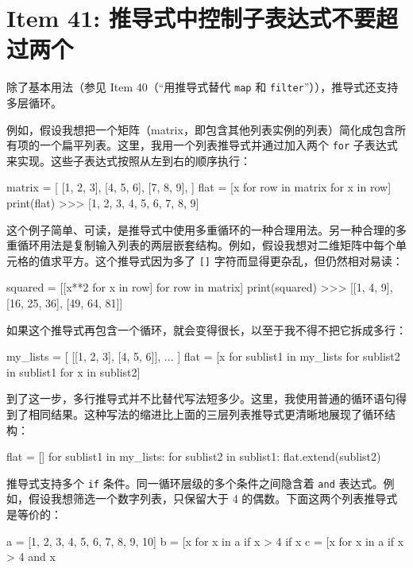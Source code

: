 \section{Item 41: 推导式中控制子表达式不要超过两个}

除了基本用法（参见 Item 40（``用推导式替代 \texttt{map} 和 \texttt{filter}''）），推导式还支持多层循环。

例如，假设我想把一个矩阵（matrix，即包含其他列表实例的列表）简化成包含所有项的一个扁平列表。这里，我用一个列表推导式并通过加入两个 \texttt{for} 子表达式来实现。这些子表达式按照从左到右的顺序执行：

\begin{codebox}[python]
matrix = [
    [1, 2, 3],
    [4, 5, 6],
    [7, 8, 9],
]
flat = [x for row in matrix for x in row]
print(flat)
>>>
[1, 2, 3, 4, 5, 6, 7, 8, 9]
\end{codebox}

这个例子简单、可读，是推导式中使用多重循环的一种合理用法。另一种合理的多重循环用法是复制输入列表的两层嵌套结构。例如，假设我想对二维矩阵中每个单元格的值求平方。这个推导式因为多了 \texttt{[]} 字符而显得更杂乱，但仍然相对易读：

\begin{codebox}[python]
squared = [[x**2 for x in row] for row in matrix]
print(squared)
>>>
[[1, 4, 9], [16, 25, 36], [49, 64, 81]]
\end{codebox}

如果这个推导式再包含一个循环，就会变得很长，以至于我不得不把它拆成多行：

\begin{codebox}[python]
my_lists = [
    [[1, 2, 3], [4, 5, 6]],
    ...
]
flat = [x for sublist1 in my_lists
        for sublist2 in sublist1
        for x in sublist2]
\end{codebox}

到了这一步，多行推导式并不比替代写法短多少。这里，我使用普通的循环语句得到了相同结果。这种写法的缩进比上面的三层列表推导式更清晰地展现了循环结构：

\begin{codebox}[python]
flat = []
for sublist1 in my_lists:
    for sublist2 in sublist1:
        flat.extend(sublist2)
\end{codebox}

推导式支持多个 \texttt{if} 条件。同一循环层级的多个条件之间隐含着 \texttt{and} 表达式。例如，假设我想筛选一个数字列表，只保留大于 4 的偶数。下面这两个列表推导式是等价的：

\begin{codebox}[python]
a = [1, 2, 3, 4, 5, 6, 7, 8, 9, 10]
b = [x for x in a if x > 4 if x %
c = [x for x in a if x > 4 and x %
\end{codebox}

